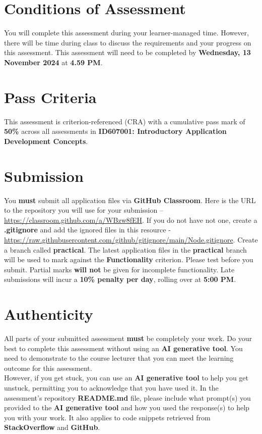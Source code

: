 \documentclass{article}
\begin{document}
\section*{Conditions of Assessment}
You will complete this assessment during your learner-managed time. However, there will be time during class to discuss the requirements and your progress on this assessment. This assessment will need to be completed by \textbf{Wednesday, 13 November 2024} at \textbf{4.59 PM}. 

\section*{Pass Criteria}
This assessment is criterion-referenced (CRA) with a cumulative pass mark of \textbf{50\%} across all assessments in \textbf{ID607001: Introductory Application Development Concepts}.

\section*{Submission}
You \textbf{must} submit all application files via \textbf{GitHub Classroom}. Here is the URL to the repository you will use for your submission – \href{https://classroom.github.com/a/WBzw8fEH}{https://classroom.github.com/a/WBzw8fEH}. If you do not have not one, create a \textbf{.gitignore} and add the ignored files in this resource - \href{https://raw.githubusercontent.com/github/gitignore/main/Node.gitignore}{https://raw.githubusercontent.com/github/gitignore/main/Node.gitignore}. Create a branch called \textbf{practical}. The latest application files in the \textbf{practical} branch will be used to mark against the \textbf{Functionality} criterion. Please test before you submit. Partial marks \textbf{will not} be given for incomplete functionality. Late submissions will incur a \textbf{10\% penalty per day}, rolling over at \textbf{5:00 PM}.


\section*{Authenticity}
All parts of your submitted assessment \textbf{must} be completely your work. Do your best to complete this assessment without using an \textbf{AI generative tool}. You need to demonstrate to the course lecturer that you can meet the learning outcome for this assessment. \\
 
 However, if you get stuck, you can use an \textbf{AI generative tool} to help you get unstuck, permitting you to acknowledge that you have used it. In the assessment's repository \textbf{README.md} file, please include what prompt(s) you provided to the \textbf{AI generative tool} and how you used the response(s) to help you with your work. It also applies to code snippets retrieved from \textbf{StackOverflow} and \textbf{GitHub}. \\
 
\end{document}
